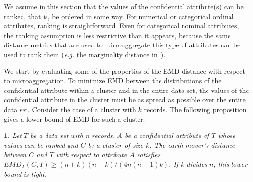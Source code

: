 \documentclass[10pt,journal,compsoc]{IEEEtran}
\theoremstyle{definition}
\theoremstyle{plain}
\newtheorem{prop}{\protect\propositionname}
\providecommand{\propositionname}{Proposition}
\begin{document}
We assume in this section that the values of the confidential attribute(s)
can be ranked, that is, be ordered in some
way. For numerical or categorical ordinal attributes, 
ranking is straightforward. Even for categorical nominal
attributes, the ranking assumption is less restrictive
than it appears, because
the same distance metrics that are used to microaggregate
this type of attributes  
can be used to rank them ({\em e.g.} 
the marginality distance in~\cite{Domingo13,SoriaVLDB14}).

We start by evaluating some of the properties of the EMD distance with respect
to microaggregation. To minimize EMD between 
the distributions of the confidential attribute within a cluster 
and in the entire data set,
the values of the confidential attribute in the cluster must be as
spread as possible over the entire data set. Consider the case of
a cluster with $k$ records. The following proposition gives 
a lower bound of EMD for such a cluster.
\begin{prop}
	\label{prop:min}Let $T$ be a data set with $n$ records, $A$
be a confidential attribute of $T$ whose values can be ranked 
and $C$ be a cluster of size $k$.
	The earth mover's distance between $C$ and $T$ 
with respect to  
	attribute $A$ satisfies 
$EMD_{A}(C,T)\ge(n+k)(n-k)/(4n(n-1)k)$.
If $k$ divides $n$, this lower bound is tight.\end{prop}
\end{document}
